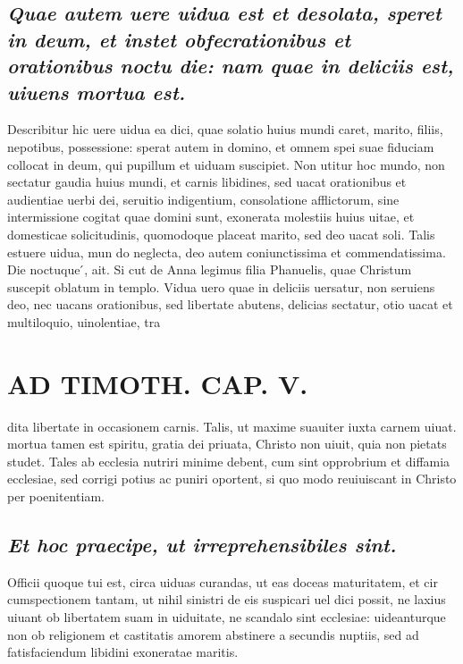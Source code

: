 \documentclass{article}
\begin{document}
\begin{pages}
\subsection*{\textit{Quae autem uere uidua est et desolata, speret in deum, et instet obfecrationibus et orationibus noctu die: nam quae in deliciis est, uiuens mortua est. }}\pstart Describitur hic uere uidua ea dici, quae solatio huius mundi caret, marito, filiis, nepotibus, possessione: sperat autem in domino, et omnem spei suae fiduciam collocat in deum, qui pupillum et uiduam suscipiet. Non utitur hoc mundo, non sectatur gaudia huius mundi, et carnis libidines, sed uacat orationibus et audientiae uerbi dei, seruitio indigentium, consolatione afflictorum, sine intermissione cogitat quae domini sunt, exonerata molestiis huius uitae, et domesticae solicitudinis, quomodoque placeat marito, sed deo uacat soli. Talis estuere uidua, mun do neglecta, deo autem coniunctissima et commendatissima. Die noctuque ́, ait. Si cut de Anna legimus filia Phanuelis, quae Christum suscepit oblatum in templo. Vidua uero quae in deliciis uersatur, non seruiens deo, nec uacans orationibus, sed libertate abutens, delicias sectatur, otio uacat et multiloquio, uinolentiae, tra\pend
\section*{AD TIMOTH. CAP. V. }
\marginpar{[ p.515 ]}\pstart dita libertate in occasionem carnis. Talis, ut maxime suauiter iuxta carnem uiuat. mortua tamen est spiritu, gratia dei priuata, Christo non uiuit, quia non pietats studet. Tales ab ecclesia nutriri minime debent, cum sint opprobrium et diffamia ecclesiae, sed corrigi potius ac puniri oportent, si quo modo reuiuiscant in Christo per poenitentiam.  \pend
{}
{}
\subsection*{\textit{Et hoc praecipe, ut irreprehensibiles sint. }}\pstart Officii quoque tui est, circa uiduas curandas, ut eas doceas maturitatem, et cir cumspectionem tantam, ut nihil sinistri de eis suspicari uel dici possit, ne laxius uiuant ob libertatem suam in uiduitate, ne scandalo sint ecclesiae: uideanturque non ob religionem et castitatis amorem abstinere a secundis nuptiis, sed ad fatisfaciendum libidini exoneratae maritis.  \pend
{}
{}

\end{pages}
\end{document}

